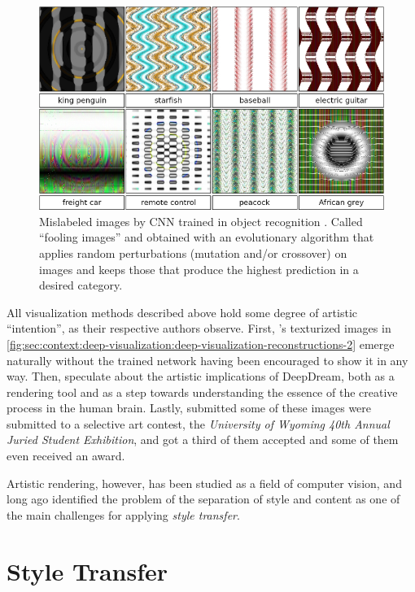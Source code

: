\begin{figure}[htbp]
  \includegraphics[width=\textwidth]{gfx/deep-visualization-fooling}
  \caption{
    Mislabeled images by CNN trained in object recognition \cite{Nguyen2014}.
    Called ``fooling images'' and obtained with an evolutionary algorithm that applies random perturbations (mutation and/or crossover) on images and keeps those that produce the highest prediction in a desired category.
  }
  \label{fig:sec:context:deep-visualization:deep-visualization-fooling}
\end{figure}

All visualization methods described above hold some degree of artistic ``intention'', as their respective authors observe.
First, \citeauthor{Mahendran2014}'s texturized images in \autoref{fig:sec:context:deep-visualization:deep-visualization-reconstructions-2} emerge naturally without the trained network having been encouraged to show it in any way.
Then, \citeauthor{Mordvintsev2015} speculate about the artistic implications of DeepDream, both as a rendering tool and as a step towards understanding the essence of the creative process in the human brain.
Lastly, \citeauthor{Nguyen2014} submitted some of these images were submitted to a selective art contest, the \emph{University of Wyoming 40th Annual Juried Student Exhibition}, and got a third of them accepted and some of them even received an award.

Artistic rendering, however, has been studied as a field of computer vision, and long ago identified the problem of the separation of style and content as one of the main challenges for applying \emph{style transfer}.



\section{Style Transfer}
\label{sec:context:style-transfer}

